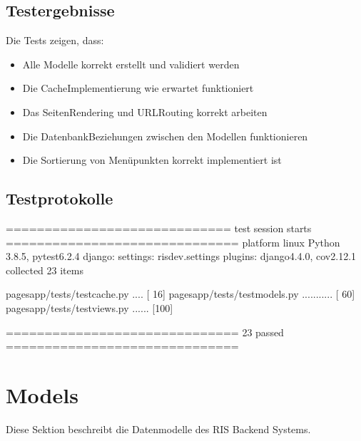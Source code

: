 \documentclass[a4paper,12pt,ngerman]{sphinxmanual}
\begin{document}
\subsection{Testergebnisse}
\label{\detokenize{sections/test_durchfuehrung:testergebnisse}}
\sphinxAtStartPar
Die Tests zeigen, dass:
\begin{itemize}
\item {} 
\sphinxAtStartPar
Alle Modelle korrekt erstellt und validiert werden

\item {} 
\sphinxAtStartPar
Die Cache\sphinxhyphen{}Implementierung wie erwartet funktioniert

\item {} 
\sphinxAtStartPar
Das Seiten\sphinxhyphen{}Rendering und URL\sphinxhyphen{}Routing korrekt arbeiten

\item {} 
\sphinxAtStartPar
Die Datenbank\sphinxhyphen{}Beziehungen zwischen den Modellen funktionieren

\item {} 
\sphinxAtStartPar
Die Sortierung von Menüpunkten korrekt implementiert ist

\end{itemize}


\subsection{Testprotokolle}
\label{\detokenize{sections/test_durchfuehrung:testprotokolle}}
\begin{sphinxVerbatim}[commandchars=\\\{\}]
============================= test session starts ==============================
platform linux \PYGZhy{}\PYGZhy{} Python 3.8.5, pytest\PYGZhy{}6.2.4
django: settings: ris\PYGZus{}dev.settings
plugins: django\PYGZhy{}4.4.0, cov\PYGZhy{}2.12.1
collected 23 items

pages\PYGZus{}app/tests/test\PYGZus{}cache.py .... [ 16\PYGZpc{}]
pages\PYGZus{}app/tests/test\PYGZus{}models.py ........... [ 60\PYGZpc{}]
pages\PYGZus{}app/tests/test\PYGZus{}views.py ...... [100\PYGZpc{}]

============================== 23 passed ==============================
\end{sphinxVerbatim}

\sphinxstepscope


\section{Models}
\label{\detokenize{sections/models:models}}\label{\detokenize{sections/models::doc}}
\sphinxAtStartPar
Diese Sektion beschreibt die Datenmodelle des RIS Backend Systems.
\end{document}
